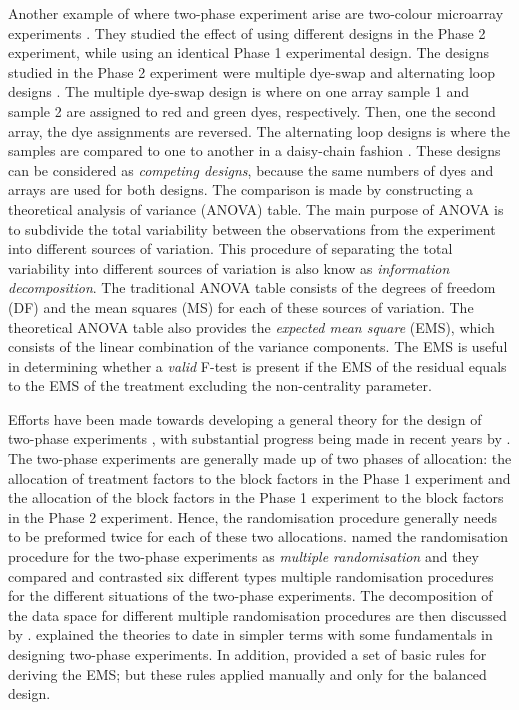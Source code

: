 \documentclass[article]{jss}
\begin{document}
Another example of where two-phase experiment arise are two-colour microarray experiments \citep{Jarrett2008}. They studied the effect of using different designs in the Phase 2 experiment, while using an identical Phase 1 experimental design. The designs studied in the Phase 2 experiment were multiple dye-swap and alternating loop designs \citep{Churchill2002}. The multiple dye-swap design is where on one array sample 1 and sample 2 are assigned to red and green dyes, respectively. Then, one the second array, the dye assignments are reversed. The alternating loop designs is where the samples are compared to one to another in a daisy-chain fashion \citep{Churchill2002}. These designs can be considered as \emph{competing designs}, because the same numbers of dyes and arrays are used for both designs. The comparison is made by constructing a theoretical analysis of variance (ANOVA) table. The main purpose of ANOVA is to subdivide the total variability between the observations from the experiment into different sources of variation. This procedure of separating the total variability into different sources of variation is also know as \emph{information decomposition}. The traditional ANOVA table consists of the degrees of freedom (DF) and the mean squares (MS) for each of these sources of variation. The theoretical ANOVA table also provides the \emph{expected mean square} (EMS), which consists of the linear combination of the variance components. The EMS is useful in determining whether a \emph{valid} F-test is present if the EMS of the residual equals to the EMS of the treatment excluding the non-centrality parameter. 

Efforts have been made towards developing a general theory for the design of two-phase experiments \citep{Brien1983, Wood1988, Brien1999, Jarrett2008}, with substantial progress being made in recent years by \cite{Brien2006b, Brien2009, Brien2010}. The two-phase experiments are generally made up of two phases of allocation: the allocation of treatment factors to the block factors in the Phase 1 experiment and the allocation of the block factors in the Phase 1 experiment to the block factors in the Phase 2 experiment. Hence, the randomisation procedure generally needs to be preformed twice for each of these two allocations. \cite{Brien2006b} named the randomisation procedure for the two-phase experiments as \emph{multiple randomisation} and they compared and contrasted six different types multiple randomisation procedures for the different situations of the two-phase experiments. The decomposition of the data space for different multiple randomisation procedures are then discussed by \cite{Brien2009, Brien2010}. \cite{Brien2011} explained the theories to date in simpler terms with some fundamentals in designing two-phase experiments. In addition,  \cite{Brien2011} provided a set of basic rules for deriving the EMS; but these rules applied manually and only for the balanced design.  
\end{document}
